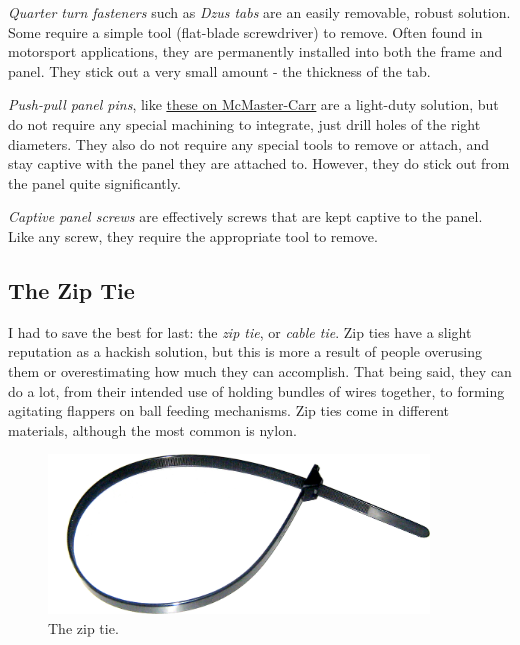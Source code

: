 	\begin{asparaenum}[a)]
		\item \textit{Quarter turn fasteners} such as \textit{Dzus tabs} are an easily removable, robust solution. Some require a simple tool (flat-blade screwdriver) to remove. Often found in motorsport applications, they are permanently installed into both the frame and panel. They stick out a very small amount - the thickness of the tab.
		\item \textit{Push-pull panel pins}, like \href{https://www.mcmaster.com/panel-fasteners/screws-and-bolts/push-pull-captive-panel-screws/}{\color{red}\underline{these on McMaster-Carr}} are a light-duty solution, but do not require any special machining to integrate, just drill holes of the right diameters. They also do not require any special tools to remove or attach, and stay captive with the panel they are attached to. However, they do stick out from the panel quite significantly.
		\item \textit{Captive panel screws} are effectively screws that are kept captive to the panel. Like any screw, they require the appropriate tool to remove.
	\end{asparaenum}
	
	\subsection{The Zip Tie}
	I had to save the best for last: the \textit{zip tie}, or \textit{cable tie}. Zip ties have a slight reputation as a hackish solution, but this is more a result of people overusing them or overestimating how much they can accomplish. That being said, they can do a lot, from their intended use of holding bundles of wires together, to forming agitating flappers on ball feeding mechanisms. Zip ties come in different materials, although the most common is nylon.
	
	\begin{figure}[H]
		\includegraphics[width=0.9\textwidth]{imgs/ziptie.png}
		\caption{The zip tie.}
	\end{figure}
	
